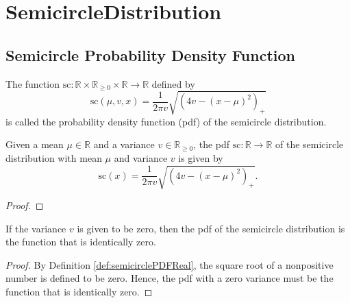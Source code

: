 \chapter{SemicircleDistribution}

\section{Semicircle Probability Density Function}



\begin{definition}\label{def:semicirclePDFReal}
  \leanok
    The function $\mathrm{sc} : \mathbb{R} \times \mathbb{R}_{\geq 0} \times \mathbb{R} \rightarrow \mathbb{R}$ defined by
   \[
    \mathrm{sc}(\mu,v,x)
    = \frac{1}{2πv} \sqrt{(4v - (x - μ)^2)_+}
   \]
   is called the probability density function (pdf) of the semicircle distribution.
\end{definition}
\begin{lemma}\label{lem:semicirclePDFReal_def}
  \leanok
    Given a mean $\mu \in \mathbb{R}$ and a variance $v \in \mathbb{R}_{\geq 0}$, the pdf $\mathrm{sc} : \mathbb{R} \rightarrow \mathbb{R}$
    of the semicircle distribution with mean $\mu$ and variance $v$ is given by
  \[
    \mathrm{sc}(x) =
    \frac{1}{2πv} \sqrt{(4v - (x - μ)^2)_+}.
  \]
\end{lemma}
\begin{proof}
\leanok
\end{proof}
\begin{lemma}\label{lem:semicirclePDFReal_zero_var}
    \leanok
    If the variance $v$ is given to be zero, then the pdf of the semicircle distribution is the function that is identically zero.
\end{lemma}
\begin{proof}
    \leanok
    By Definition \ref{def:semicirclePDFReal}, the square root of a nonpositive number is defined to be zero.
    Hence, the pdf with a zero variance must be the function that is identically zero.
\end{proof}
